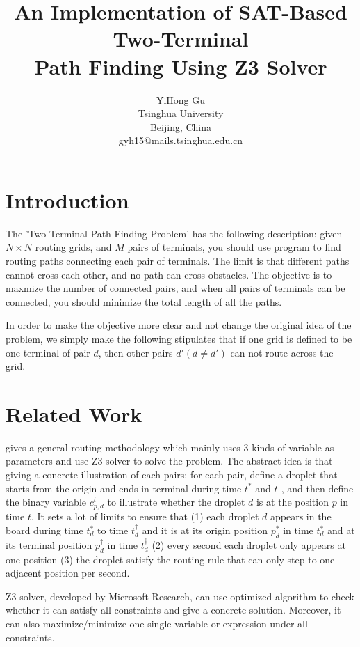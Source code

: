 \documentclass[twocolumn]{article}
\title{\textbf{An Implementation of SAT-Based Two-Terminal \\ Path Finding Using Z3 Solver}}
\author{YiHong Gu \\ Tsinghua University \\ Beijing, China \\ gyh15@mails.tsinghua.edu.cn}
\date{}
\begin{document}
\maketitle

\section{Introduction}

The 'Two-Terminal Path Finding Problem' has the following description: given $N \times N$ routing grids, and $M$ pairs of terminals, you should use program to find routing paths connecting each pair of terminals. The limit is that different paths cannot cross each other, and no path can cross obstacles. The objective is to maxmize the number of connected pairs, and when all pairs of terminals can be connected, you should minimize the total length of all the paths.

In order to make the objective more clear and not change the original idea of the problem, we simply make the following stipulates that if one grid is defined to be one terminal of pair $d$, then other pairs $d'(d \neq d')$ can not route across the grid.

\section{Related Work}

\cite{source1} gives a general routing methodology which mainly uses 3 kinds of variable as parameters and use Z3 solver to solve the problem. The abstract idea is that giving a concrete illustration of each pairs: for each pair, define a droplet that starts from the origin and ends in terminal during time $t^*$ and $t^\dagger$, and then define the binary variable $c_{p,d}^t$ to illustrate whether the droplet $d$ is at the position $p$ in time $t$. It sets a lot of limits to ensure that (1) each droplet $d$ appears in the board during time $t^*_d$ to time $t^\dagger_d$ and it is at its origin position $p^*_d$ in time $t^*_d$ and at its terminal position $p^\dagger_d$ in time $t^\dagger_d$ (2) every second each droplet only appears at one position (3) the droplet satisfy the routing rule that can only step to one adjacent position per second.

Z3 solver\cite{source2}, developed by Microsoft Research, can use optimized algorithm to check whether it can satisfy all constraints and give a concrete solution. Moreover, it can also maximize/minimize one single variable or expression under all constraints.
\end{document}
